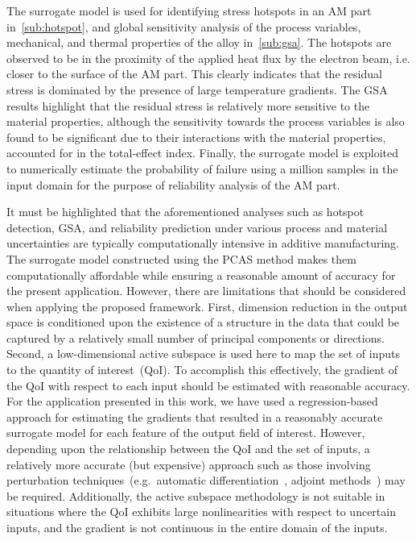 The surrogate model is used for identifying stress hotspots in an AM part in~\ref{sub:hotspot}, and global sensitivity
analysis of the process variables, mechanical, and thermal properties of the alloy in~\ref{sub:gsa}. 
The hotspots are observed to be in the proximity of the applied heat flux by the electron beam, i.e. 
closer to the surface of the AM part. This clearly indicates that the residual stress is dominated by 
the presence of large temperature gradients. The GSA results 
highlight that the residual stress is relatively more sensitive to the material properties, although the sensitivity
towards the process variables is also found to be significant due to their interactions with the material properties,
accounted for in the total-effect index. Finally, the surrogate model is exploited to numerically estimate the
probability of failure using a million samples in the input domain for the purpose of reliability analysis of the AM part. 

It must be highlighted that the aforementioned
analyses such as hotspot detection, GSA, and reliability prediction under various process and material uncertainties
 are typically computationally intensive in additive manufacturing.
 The surrogate model constructed using the PCAS method makes them computationally
affordable while ensuring a reasonable amount of accuracy for the present application.
 However, there are limitations that should be considered
when applying the proposed framework. First, dimension reduction in the output space is conditioned upon the
existence of a structure in the data that could be captured by a relatively small number of principal components or
directions. Second, a low-dimensional active subspace is used here to map the set of inputs to the quantity of
 interest~(QoI).
To accomplish this effectively, the gradient of the QoI with respect to each input should be estimated
with reasonable accuracy. For the application presented in this work, we have used a regression-based approach for 
estimating the gradients that resulted in a reasonably accurate surrogate model for each feature of the output field of interest.
However, depending upon the relationship between the QoI and the set of inputs, a relatively more accurate
(but expensive) approach
such as those involving perturbation techniques~(e.g.~automatic differentiation~\cite{Kiparissides:2009}, adjoint 
methods~\cite{Borzi:2011, Alexanderian:2017}) may be required. Additionally, the active subspace methodology is
not suitable in situations where the QoI exhibits large nonlinearities with respect to uncertain inputs, and the
gradient is not continuous in the entire domain of the inputs.

